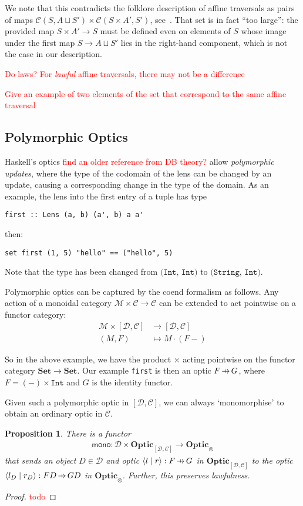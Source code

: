 \documentclass[11pt,a4paper]{article}
\theoremstyle{plain}
\newtheorem{proposition}[theorem]{Proposition}
\theoremstyle{definition}
\newcommand{\C}{\mathscr{C}}
\newcommand{\D}{\mathscr{D}}
\newcommand{\M}{\mathscr{M}}
\newcommand{\Set}{\mathbf{Set}}
\newcommand{\Optic}{\mathbf{Optic}}
\newcommand{\rep}[2]{{\ensuremath \left\langle #1 \mid #2 \right\rangle}}
\newcommand{\hto}{\ensuremath{\,\mathaccent\shortmid\rightarrow\,}}
\newcommand{\todo}[1]{\textcolor{red}{\small #1}}
\begin{document}
We note that this contradicts the folklore description of affine traversals as pairs of maps $\C(S, A \sqcup S') \times \C(S\times A', S')$, see~\cite{AffineTraversalPost}. That set is in fact ``too large'': the provided map $S \times A' \to S$ must be defined even on elements of $S$ whose image under the first map $S \to A \sqcup S'$ lies in the right-hand component, which is not the case in our description.

\todo{Do laws? For \emph{lawful} affine traversals, there may not be a difference}

\todo{Give an example of two elements of the set that correspond to the same affine traversal}

\subsection{Polymorphic Optics}
Haskell's optics \todo{find an older reference from DB theory?} allow \emph{polymorphic updates}, where the type of the codomain of the lens can be changed by an update, causing a corresponding change in the type of the domain. As an example, the lens into the first entry of a tuple has type
\begin{verbatim}
first :: Lens (a, b) (a', b) a a'
\end{verbatim}
then:
\begin{verbatim}
set first (1, 5) "hello" == ("hello", 5)
\end{verbatim}
Note that the type has been changed from $\texttt{(Int, Int)}$ to $\texttt{(String, Int)}$.

Polymorphic optics can be captured by the coend formalism as follows. Any action of a monoidal category $\M \times \C \to \C$ can be extended to act pointwise on a functor category:
\begin{align*}
  \M \times [\D, \C] &\to [\D, \C] \\
  (M, F) &\mapsto  M \cdot (F-)
\end{align*}

So in the above example, we have the product $\times$ acting pointwise on the functor category $\Set \to \Set$. Our example \texttt{first} is then an optic $F \hto G$, where $F = (-) \times \mathtt{Int}$ and $G$ is the identity functor.

Given such a polymorphic optic in $[\D, \C]$, we can always `monomorphise' to obtain an ordinary optic in $\C$.
\begin{proposition}
  There is a functor
  \begin{align*}
    \mathsf{mono} : \D \times \Optic_{[\D, \C]} \to \Optic_\otimes
  \end{align*}
  that sends an object $D \in \D$ and optic $\rep{l}{r } : F \hto G$ in $\Optic_{[\D, \C]}$ to the optic $\rep{l_D}{r_D } : FD \hto GD$ in $\Optic_\otimes$. Further, this preserves lawfulness.
\end{proposition}
\begin{proof}
  \todo{todo}
\end{proof}
\end{document}
